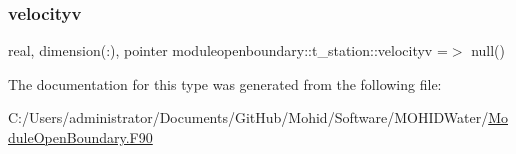 \subsubsection{\texorpdfstring{velocityv}{velocityv}}
{\footnotesize\ttfamily real, dimension(\+:), pointer moduleopenboundary\+::t\+\_\+station\+::velocityv =$>$ null()\hspace{0.3cm}{\ttfamily [private]}}



The documentation for this type was generated from the following file\+:\begin{DoxyCompactItemize}
\item 
C\+:/\+Users/administrator/\+Documents/\+Git\+Hub/\+Mohid/\+Software/\+M\+O\+H\+I\+D\+Water/\mbox{\hyperlink{_module_open_boundary_8_f90}{Module\+Open\+Boundary.\+F90}}\end{DoxyCompactItemize}
